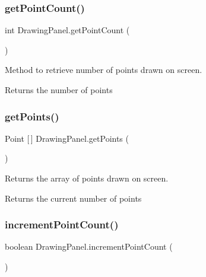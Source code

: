\subsubsection{\texorpdfstring{get\+Point\+Count()}{getPointCount()}}
{\footnotesize\ttfamily int Drawing\+Panel.\+get\+Point\+Count (\begin{DoxyParamCaption}{ }\end{DoxyParamCaption})}



Method to retrieve number of points drawn on screen. 

\begin{DoxyReturn}{Returns}
the number of points 
\end{DoxyReturn}
\mbox{\label{class_drawing_panel_a7622f1394438b6ec633ac2cde884bb99}} 
\subsubsection{\texorpdfstring{get\+Points()}{getPoints()}}
{\footnotesize\ttfamily Point \mbox{[}$\,$\mbox{]} Drawing\+Panel.\+get\+Points (\begin{DoxyParamCaption}{ }\end{DoxyParamCaption})}



Returns the array of points drawn on screen. 

\begin{DoxyReturn}{Returns}
the current number of points 
\end{DoxyReturn}
\mbox{\label{class_drawing_panel_a4b121aedcf7c0c4a333519db1e340a9b}} 
\subsubsection{\texorpdfstring{increment\+Point\+Count()}{incrementPointCount()}}
{\footnotesize\ttfamily boolean Drawing\+Panel.\+increment\+Point\+Count (\begin{DoxyParamCaption}{ }\end{DoxyParamCaption})}



